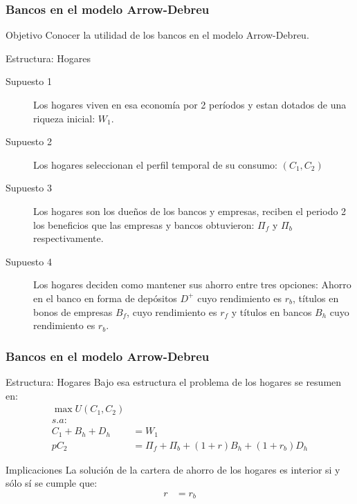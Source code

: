 \begin{frame}
    \frametitle{{\normalsize Bancos en el modelo Arrow-Debreu} {}}
   \begin{block} {Objetivo}
       Conocer la utilidad de los bancos en el modelo Arrow-Debreu. 	
   \end{block}	
   \begin{block} {Estructura: Hogares}
       {\footnotesize \begin{description}
           \item[Supuesto 1] Los hogares viven en esa economía por 2 períodos y estan dotados de una riqueza inicial: $W_{1}$.
           \item[Supuesto 2] Los hogares seleccionan el perfil temporal de su consumo: $(C_{1}, C_{2})$
           \item[Supuesto 3] Los hogares son los dueños de los bancos y empresas, reciben el periodo 2 los beneficios que las empresas y bancos obtuvieron: $\Pi_{f}$ y $\Pi_{b}$ respectivamente. 
           \item[Supuesto 4] Los hogares deciden como mantener sus ahorro entre tres opciones: Ahorro en el banco en forma  de depósitos $D^{+}$ cuyo rendimiento es $r_{b}$, títulos en bonos de empresas $B_{f} $, cuyo rendimiento es $r_{f} $ y títulos en bancos $B_{h}$ cuyo rendimiento es $r_{b}$. 	
          \end{description}}
     
   \end{block}	
\end{frame}



\begin{frame}
    \frametitle{{\normalsize Bancos en el modelo Arrow-Debreu} {}}
    
    \begin{block} {Estructura: Hogares} 
     Bajo esa estructura el problema de los hogares se resumen en:
    \begin{align}
    \max U(C_{1},C_{2})\nonumber \\
    s.a:\nonumber\\
    C_{1}+B_{h}+D_{h}&=W_{1}\nonumber\\      pC_{2}&=\Pi_{f}+\Pi_{b}+(1+r)B_{h}+(1+r_{b})D_{h}\nonumber
    \end{align}
    \end{block}
      \begin{block} {Implicaciones}
        La solución de la cartera de ahorro de los hogares es interior si y sólo sí se cumple que:
        \begin{align}
        r&=r_{b}
        \end{align} 	
       
    \end{block}	

\end{frame}



